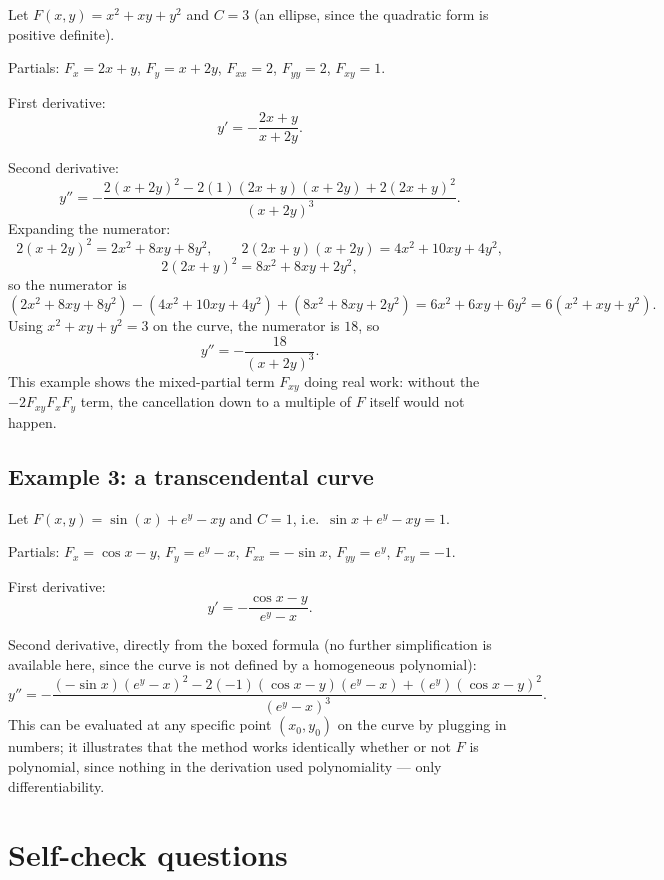 \documentclass{essay}
\begin{document}
Let $F(x,y) = x^2 + xy + y^2$ and $C = 3$ (an ellipse, since the quadratic form is positive
definite).

Partials: $F_x = 2x + y$, $F_y = x + 2y$, $F_{xx} = 2$, $F_{yy} = 2$, $F_{xy} = 1$.

First derivative:
\[
y' = -\frac{2x+y}{x+2y}.
\]

Second derivative:
\[
y'' = -\frac{2(x+2y)^2 - 2(1)(2x+y)(x+2y) + 2(2x+y)^2}{(x+2y)^3}.
\]
Expanding the numerator:
\[
2(x+2y)^2 = 2x^2 + 8xy + 8y^2, \qquad
2(2x+y)(x+2y) = 4x^2 + 10xy + 4y^2,
\]
\[
2(2x+y)^2 = 8x^2 + 8xy + 2y^2,
\]
so the numerator is
\[
(2x^2+8xy+8y^2) - (4x^2+10xy+4y^2) + (8x^2+8xy+2y^2) = 6x^2 + 6xy + 6y^2 = 6(x^2+xy+y^2).
\]
Using $x^2 + xy + y^2 = 3$ on the curve, the numerator is $18$, so
\[
y'' = -\frac{18}{(x+2y)^3}.
\]
This example shows the mixed-partial term $F_{xy}$ doing real work: without the $-2F_{xy}F_xF_y$
term, the cancellation down to a multiple of $F$ itself would not happen.

\subsection*{Example 3: a transcendental curve}

Let $F(x,y) = \sin(x) + e^{y} - xy$ and $C = 1$, i.e.\ $\sin x + e^y - xy = 1$.

Partials: $F_x = \cos x - y$, $F_y = e^y - x$, $F_{xx} = -\sin x$, $F_{yy} = e^y$,
$F_{xy} = -1$.

First derivative:
\[
y' = -\frac{\cos x - y}{e^y - x}.
\]

Second derivative, directly from the boxed formula (no further simplification is available
here, since the curve is not defined by a homogeneous polynomial):
\[
y'' = -\frac{(-\sin x)(e^y-x)^2 - 2(-1)(\cos x - y)(e^y - x) + (e^y)(\cos x - y)^2}
{(e^y - x)^3}.
\]
This can be evaluated at any specific point $(x_0, y_0)$ on the curve by plugging in numbers;
it illustrates that the method works identically whether or not $F$ is polynomial, since
nothing in the derivation used polynomiality — only differentiability.

\section{Self-check questions}
\end{document}
